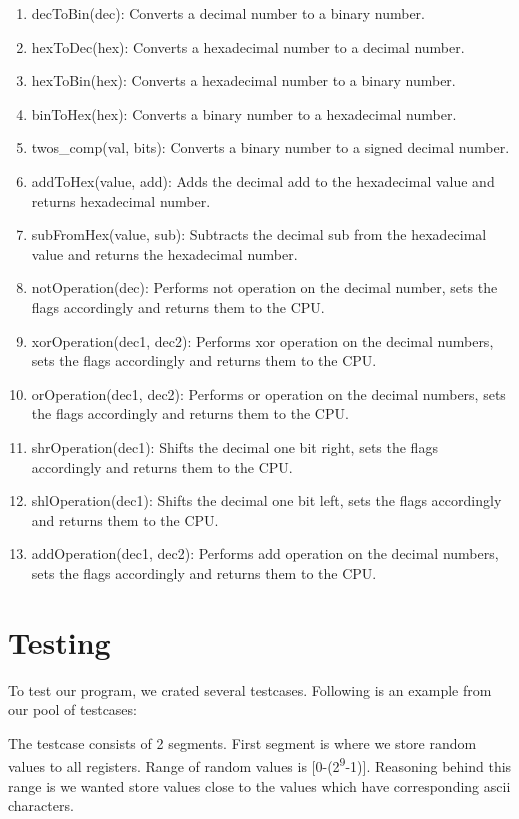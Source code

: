 \documentclass[12pt,a4paper]{article}
\begin{document}
\begin{enumerate}
	\item decToBin(dec): Converts a decimal number to a binary number.
	\item hexToDec(hex): Converts a hexadecimal number to a decimal number.
	\item hexToBin(hex): Converts a hexadecimal number to a binary number.
	\item binToHex(hex): Converts a binary number to a hexadecimal number.
	\item twos\_comp(val, bits): Converts a binary number to a signed decimal number.
	\item addToHex(value, add): Adds the decimal add to the hexadecimal value and returns hexadecimal number.
	\item subFromHex(value, sub): Subtracts the decimal sub from the hexadecimal value and returns the hexadecimal number.
	\item notOperation(dec): Performs not operation on the decimal number, sets the flags accordingly and returns them to the CPU.
	\item xorOperation(dec1, dec2): Performs xor operation on the decimal numbers, sets the flags accordingly and returns them to the CPU.
	\item orOperation(dec1, dec2): Performs or operation on the decimal numbers, sets the flags accordingly and returns them to the CPU.
	\item shrOperation(dec1): Shifts the decimal one bit right, sets the flags accordingly and returns them to the CPU.
	\item shlOperation(dec1): Shifts the decimal one bit left, sets the flags accordingly and returns them to the CPU.
	\item addOperation(dec1, dec2): Performs add operation on the decimal numbers, sets the flags accordingly and returns them to the CPU.
\end{enumerate}
\section{Testing}

To test our program, we crated several testcases. Following is an example from our pool of testcases:



The testcase consists of 2 segments. First segment is where we store random values to all registers. Range of random values is [0-(2\textsuperscript{9}-1)]. Reasoning behind this range is we wanted store values close to the values which have corresponding ascii characters. \par
\end{document}
